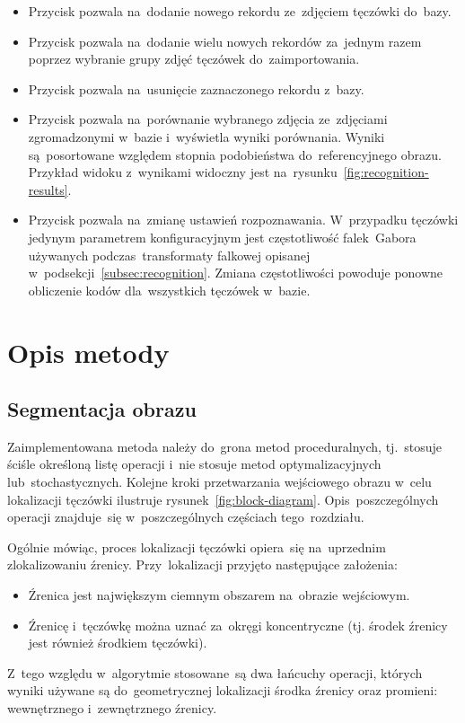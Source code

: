 \documentclass[11pt,a4paper]{article}
\begin{document}
\begin{itemize}
    \item Przycisk  pozwala na~dodanie nowego rekordu ze~zdjęciem tęczówki do~bazy.
    \item Przycisk  pozwala na~dodanie wielu nowych rekordów za~jednym razem poprzez wybranie grupy zdjęć tęczówek do~zaimportowania.
    \item Przycisk  pozwala na~usunięcie zaznaczonego rekordu z~bazy.
    \item Przycisk  pozwala na~porównanie wybranego zdjęcia ze~zdjęciami zgromadzonymi w~bazie i~wyświetla wyniki porównania.
    Wyniki są~posortowane względem stopnia podobieństwa do~referencyjnego obrazu.
    Przykład widoku z~wynikami widoczny jest na~rysunku~\ref{fig:recognition-results}.
    \item Przycisk  pozwala na~zmianę ustawień rozpoznawania.
    W~przypadku tęczówki jedynym parametrem konfiguracyjnym jest częstotliwość falek~Gabora używanych podczas~transformaty falkowej opisanej w~podsekcji~\ref{subsec:recognition}.
    Zmiana częstotliwości powoduje ponowne obliczenie kodów dla~wszystkich tęczówek w~bazie.
\end{itemize}

\section{Opis metody}
\label{sec:method}


\subsection{Segmentacja obrazu}


Zaimplementowana metoda należy do~grona metod proceduralnych, tj.~stosuje ściśle określoną listę operacji i~nie stosuje metod optymalizacyjnych lub~stochastycznych.
Kolejne kroki przetwarzania wejściowego obrazu w~celu lokalizacji tęczówki ilustruje rysunek~\ref{fig:block-diagram}.
Opis~poszczególnych operacji znajduje~się w~poszczególnych częściach tego~rozdziału.

Ogólnie mówiąc, proces lokalizacji tęczówki opiera~się na~uprzednim zlokalizowaniu źrenicy.
Przy~lokalizacji przyjęto następujące założenia:
\begin{itemize}
    \item Źrenica jest największym ciemnym obszarem na~obrazie wejściowym.
    \item Źrenicę i~tęczówkę można uznać za~okręgi koncentryczne (tj. środek źrenicy jest również środkiem tęczówki).
\end{itemize}
Z~tego względu w~algorytmie stosowane~są dwa łańcuchy operacji, których wyniki używane są do~geometrycznej lokalizacji środka źrenicy oraz promieni: wewnętrznego i~zewnętrznego źrenicy.
\end{document}

